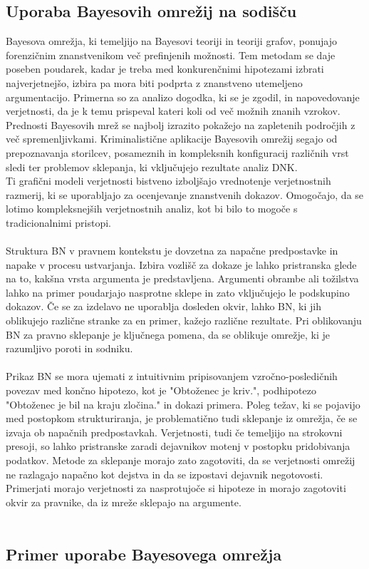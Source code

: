 \documentclass[12pt,a4paper]{amsart}
\theoremstyle{definition} %
\theoremstyle{plain} %
\begin{document}
\subsection{Uporaba Bayesovih omrežij na sodišču}
Bayesova omrežja, ki temeljijo na Bayesovi teoriji in teoriji grafov, ponujajo forenzičnim znanstvenikom več prefinjenih možnosti. Tem metodam 
se daje poseben poudarek, kadar je treba med konkurenčnimi hipotezami izbrati najverjetnejšo, izbira pa mora biti podprta z znanstveno utemeljeno 
argumentacijo. Primerna so za analizo dogodka, ki se je zgodil, in napovedovanje verjetnosti, da je k temu prispeval kateri koli od več možnih 
znanih vzrokov. Prednosti Bayesovih mrež se najbolj izrazito pokažejo na zapletenih področjih z več spremenljivkami. Kriminalistične aplikacije 
Bayesovih omrežij segajo od prepoznavanja storilcev, posameznih in kompleksnih konfiguracij različnih vrst sledi ter problemov sklepanja, ki 
vključujejo rezultate analiz DNK.\\
Ti grafični modeli verjetnosti bistveno izboljšajo vrednotenje verjetnostnih razmerij, ki se uporabljajo za ocenjevanje znanstvenih dokazov. 
Omogočajo, da se lotimo kompleksnejših verjetnostnih analiz, kot bi bilo to mogoče s tradicionalnimi pristopi. \\\\
Struktura BN v pravnem kontekstu je dovzetna za napačne predpostavke in napake v procesu ustvarjanja. Izbira vozlišč za dokaze je lahko 
pristranska glede na to, kakšna vrsta argumenta je predstavljena. Argumenti obrambe ali tožilstva lahko na primer poudarjajo nasprotne sklepe 
in zato vključujejo le podskupino dokazov. Če se za izdelavo ne uporablja dosleden okvir, lahko BN, ki jih oblikujejo različne stranke za en 
primer, kažejo različne rezultate. Pri oblikovanju BN za pravno sklepanje je ključnega pomena, da se oblikuje omrežje, ki je razumljivo poroti 
in sodniku.\\\\
Prikaz BN se mora ujemati z intuitivnim pripisovanjem vzročno-posledičnih povezav med končno hipotezo, kot je "Obtoženec je kriv.", podhipotezo 
"Obtoženec je bil na kraju zločina." in dokazi primera. Poleg težav, ki se pojavijo med postopkom strukturiranja, je problematično tudi sklepanje 
iz omrežja, če se izvaja ob napačnih predpostavkah. Verjetnosti, tudi če temeljijo na strokovni presoji, so lahko pristranske zaradi dejavnikov 
motenj v postopku pridobivanja podatkov. Metode za sklepanje morajo zato zagotoviti, da se verjetnosti omrežij ne razlagajo napačno kot dejstva in 
da se izpostavi dejavnik negotovosti. Primerjati morajo verjetnosti za nasprotujoče si hipoteze in morajo zagotoviti okvir za pravnike, da iz 
mreže sklepajo na argumente.\\\\

\subsection{Primer uporabe Bayesovega omrežja}
\end{document}
